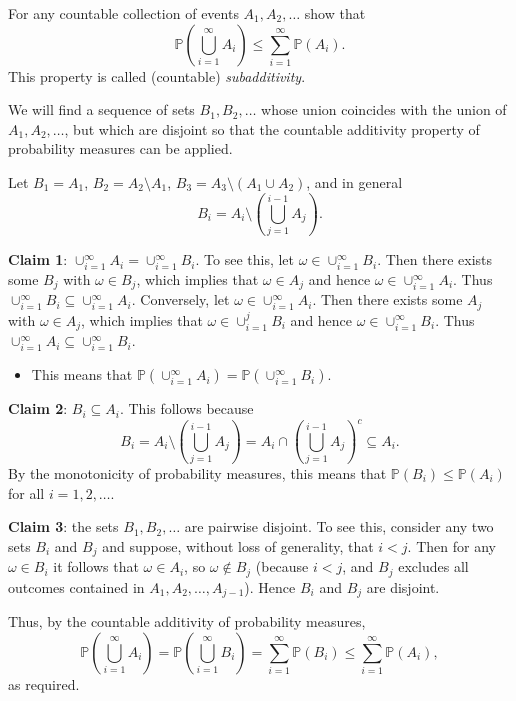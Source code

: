 \begin{exercise}
\begin{questions}
\question
For any countable collection of events $A_1,A_2,\ldots$ show that
\[
\displaystyle
\mathbb{P}\left(\bigcup_{i=1}^{\infty} A_i\right) \leq \sum_{i=1}^{\infty} \mathbb{P}(A_i).
\]
This property is called (countable) \emph{subadditivity}.
\begin{answer}
We will find a sequence of sets $B_1,B_2,\ldots$ whose union coincides with the union of $A_1,A_2,\ldots$, but which are disjoint so that the countable additivity property of probability measures can be applied.

Let $B_1 = A_1$, $B_2 = A_2\setminus A_1$, $B_3 = A_3\setminus(A_1\cup A_2)$, and in general
\[
B_i = A_i \setminus \left(\bigcup_{j=1}^{i-1} A_j\right).
\]

\textbf{Claim 1}: $\cup_{i=1}^{\infty} A_i = \cup_{i=1}^{\infty} B_i$.
To see this, let $\omega\in\cup_{i=1 }^{\infty} B_i$. Then there exists some $B_j$ with $\omega\in B_j$, which implies that $\omega\in A_j$ and hence $\omega\in\cup_{i=1}^{\infty} A_i$. Thus $\cup_{i=1}^{\infty} B_i \subseteq \cup_{i=1}^{\infty} A_i$. Conversely, let $\omega\in\cup_{i=1 }^{\infty} A_i$. Then there exists some $A_j$ with $\omega\in A_j$, which implies that $\omega\in \cup_{i=1}^{j} B_i$ and hence $\omega\in\cup_{i=1}^{\infty} B_i$. Thus $\cup_{i=1}^{\infty} A_i \subseteq \cup_{i=1}^{\infty} B_i$. 
\begin{itemize}
\item
This means that $\mathbb{P}\left(\cup_{i=1}^{\infty} A_i\right) = \mathbb{P}\left(\cup_{i=1}^{\infty} B_i\right)$.
\end{itemize}

\textbf{Claim 2}: $B_i \subseteq A_i$. This follows because
\[
B_i = A_i \setminus \left(\bigcup_{j=1}^{i-1} A_j\right) = A_i \cap\left(\bigcup_{j=1}^{i-1} A_j\right)^{c} \subseteq A_i.
\]
By the monotonicity of probability measures, this means that $\mathbb{P}(B_i)\leq\mathbb{P}(A_i)$ for all $i=1,2,\ldots$.

\textbf{Claim 3}: the sets $B_1,B_2,\ldots$ are pairwise disjoint. To see this, consider any two sets $B_i$ and $B_j$ and suppose, without loss of generality, that $i<j$. Then for any $\omega\in B_i$ it follows that $\omega\in A_i$, so $\omega\notin B_j$ (because $i<j$, and $B_j$ excludes all outcomes contained in $A_1,A_2,\ldots,A_{j-1}$). Hence $B_i$ and $B_j$ are disjoint.

Thus, by the countable additivity of probability measures,
\[
\mathbb{P}\left(\bigcup_{i=1}^{\infty} A_i\right) 
	= \mathbb{P}\left(\bigcup_{i=1}^{\infty} B_i\right)
	= \sum_{i=1}^{\infty} \mathbb{P}(B_i)%
	\leq \sum_{i=1}^{\infty} \mathbb{P}(A_i),
\]
as required.
\end{answer}


\end{questions}
\end{exercise}
